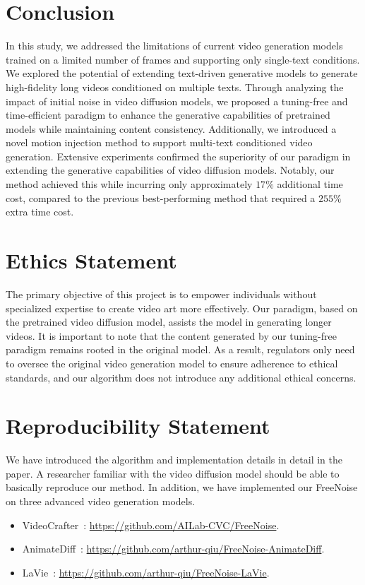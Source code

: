 \section{Conclusion}
In this study, we addressed the limitations of current video generation models trained on a limited number of frames and supporting only single-text conditions. We explored the potential of extending text-driven generative models to generate high-fidelity long videos conditioned on multiple texts. Through analyzing the impact of initial noise in video diffusion models, we proposed a tuning-free and time-efficient paradigm to enhance the generative capabilities of pretrained models while maintaining content consistency. Additionally, we introduced a novel motion injection method to support multi-text conditioned video generation. Extensive experiments confirmed the superiority of our paradigm in extending the generative capabilities of video diffusion models. Notably, our method achieved this while incurring only approximately $17\%$ additional time cost, compared to the previous best-performing method that required a $255\%$ extra time cost.


\newpage

\section{Ethics Statement}
The primary objective of this project is to empower individuals without specialized expertise to create video art more effectively. Our paradigm, based on the pretrained video diffusion model, assists the model in generating longer videos. It is important to note that the content generated by our tuning-free paradigm remains rooted in the original model. As a result, regulators only need to oversee the original video generation model to ensure adherence to ethical standards, and our algorithm does not introduce any additional ethical concerns.

\section{Reproducibility Statement}
We have introduced the algorithm and implementation details in detail in the paper. A researcher familiar with the video diffusion model should be able to basically reproduce our method. In addition, we have implemented our FreeNoise on three advanced video generation models.

\begin{itemize}

\item VideoCrafter~\citep{chen2023videocrafter1}: \href{https://github.com/AILab-CVC/FreeNoise}{https://github.com/AILab-CVC/FreeNoise}.

\item AnimateDiff~\citep{guo2023animatediff}: \href{https://github.com/arthur-qiu/FreeNoise-AnimateDiff}{https://github.com/arthur-qiu/FreeNoise-AnimateDiff}.

\item LaVie~\citep{wang2023lavie}: \href{https://github.com/arthur-qiu/FreeNoise-LaVie}{https://github.com/arthur-qiu/FreeNoise-LaVie}.

\end{itemize}

